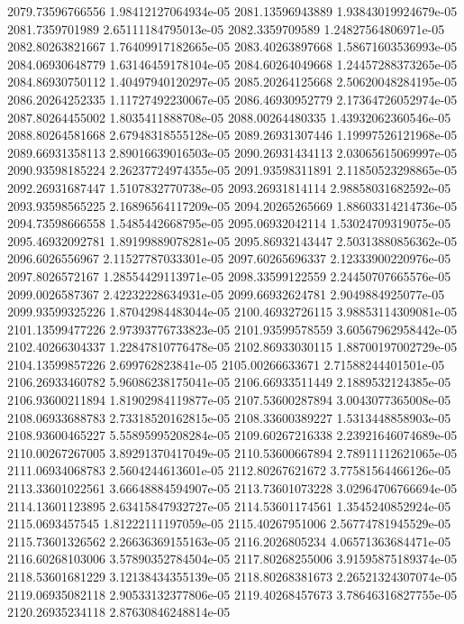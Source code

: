 {2079.73596766556 1.98412127064934e-05
2081.13596943889 1.93843019924679e-05
2081.7359701989 2.65111184795013e-05
2082.3359709589 1.24827564806971e-05
2082.80263821667 1.76409917182665e-05
2083.40263897668 1.58671603536993e-05
2084.06930648779 1.63146459178104e-05
2084.60264049668 1.24457288373265e-05
2084.86930750112 1.40497940120297e-05
2085.20264125668 2.50620048284195e-05
2086.20264252335 1.11727492230067e-05
2086.46930952779 2.17364726052974e-05
2087.80264455002 1.8035411888708e-05
2088.00264480335 1.43932062360546e-05
2088.80264581668 2.67948318555128e-05
2089.26931307446 1.19997526121968e-05
2089.66931358113 2.89016639016503e-05
2090.26931434113 2.03065615069997e-05
2090.93598185224 2.26237724974355e-05
2091.93598311891 2.11850523298865e-05
2092.26931687447 1.5107832770738e-05
2093.26931814114 2.98858031682592e-05
2093.93598565225 2.16896564117209e-05
2094.20265265669 1.88603314214736e-05
2094.73598666558 1.5485442668795e-05
2095.06932042114 1.53024709319075e-05
2095.46932092781 1.89199889078281e-05
2095.86932143447 2.50313880856362e-05
2096.6026556967 2.11527787033301e-05
2097.60265696337 2.12333900220976e-05
2097.8026572167 1.28554429113971e-05
2098.33599122559 2.24450707665576e-05
2099.0026587367 2.42232228634931e-05
2099.66932624781 2.9049884925077e-05
2099.93599325226 1.87042984483044e-05
2100.46932726115 3.98853114309081e-05
2101.13599477226 2.97393776733823e-05
2101.93599578559 3.60567962958442e-05
2102.40266304337 1.22847810776478e-05
2102.86933030115 1.88700197002729e-05
2104.13599857226 2.699762823841e-05
2105.00266633671 2.71588244401501e-05
2106.26933460782 5.96086238175041e-05
2106.66933511449 2.1889532124385e-05
2106.93600211894 1.81902984119877e-05
2107.53600287894 3.0043077365008e-05
2108.06933688783 2.73318520162815e-05
2108.33600389227 1.5313448858903e-05
2108.93600465227 5.55895995208284e-05
2109.60267216338 2.23921646074689e-05
2110.00267267005 3.89291370417049e-05
2110.53600667894 2.78911112621065e-05
2111.06934068783 2.5604244613601e-05
2112.80267621672 3.77581564466126e-05
2113.33601022561 3.66648884594907e-05
2113.73601073228 3.02964706766694e-05
2114.13601123895 2.63415847932727e-05
2114.53601174561 1.3545240852924e-05
2115.0693457545 1.81222111197059e-05
2115.40267951006 2.56774781945529e-05
2115.73601326562 2.26636369155163e-05
2116.2026805234 4.06571363684471e-05
2116.60268103006 3.57890352784504e-05
2117.80268255006 3.91595875189374e-05
2118.53601681229 3.12138434355139e-05
2118.80268381673 2.26521324307074e-05
2119.06935082118 2.90533132377806e-05
2119.40268457673 3.78646316827755e-05
2120.26935234118 2.87630846248814e-05
}
